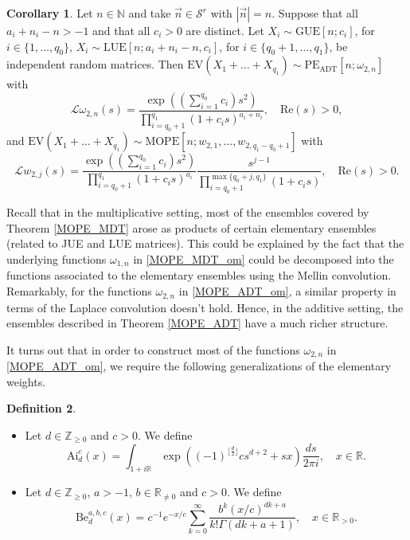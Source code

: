 \documentclass[a4paper,12pt,oneside]{article}
\theoremstyle{definition}
\newtheorem{defi}{Definition}[section]
\newtheorem{cor}[defi]{Corollary}
\newcommand{\N}{\mathbb{N}}
\newcommand{\Z}{\mathbb{Z}}
\newcommand{\R}{\mathbb{R}}
\newcommand{\om}{\omega}
\newcommand{\sz}[1]{\left| \vec{#1} \right|}
\newcommand{\LT}[1]{\mathcal{L}#1}
\begin{document}
\begin{cor} \label{MOPE_ADT_EX}
    Let $n\in\N$ and take $\vec{n}\in\mathcal{S}^r$ with $\sz{n}=n$. Suppose that all $a_i+n_i-n>-1$ and that all $c_i>0$ are distinct. Let 
    $X_i\sim\text{GUE}[n;c_i]$, for $i\in\{1,\dots,q_0\}$,
    $ X_i\sim\text{LUE}[n;a_i+n_i-n,c_i]$, for $i\in\{q_0+1,\dots,q_1\}$, 
    be independent random matrices. Then $\text{EV}(X_1+\dots+X_{q_1})\sim\text{PE}_{\text{ADT}}[n;\om_{2,n}]$
    with
        $$ \LT{\om_{2,n}}(s) = \frac{\exp\left((\sum_{i=1}^{q_0} c_i)s^2\right)}{\prod_{i=q_0+1}^{q_1} (1+c_i s)^{a_i+n_i}},\quad \text{Re}(s)>0, $$
    and $\text{EV}(X_1+\dots+X_{q_1})\sim\text{MOPE}[n;w_{2,1},\dots,w_{2,q_1-q_0+1}]$ with
        $$ \LT{w_{2,j}}(s) = \frac{\exp\left((\sum_{i=1}^{q_0} c_i)s^2\right)}{\prod_{i=q_0+1}^{q_1} (1+c_i s)^{a_i}} \frac{s^{j-1}}{\prod_{i=q_0+1}^{\max\{q_0+j,q_1\}} (1+c_i s)},\quad \text{Re}(s)>0.$$
\end{cor}

Recall that in the multiplicative setting, most of the ensembles covered by Theorem \ref{MOPE_MDT} arose as products of certain elementary ensembles (related to JUE and LUE matrices). This could be explained by the fact that the underlying functions $\om_{1,n}$ in \eqref{MOPE_MDT_om} could be decomposed into the functions associated to the elementary ensembles using the Mellin convolution. Remarkably, for the functions $\om_{2,n}$ in \eqref{MOPE_ADT_om}, a similar property in terms of the Laplace convolution doesn't hold. Hence, in the additive setting, the ensembles described in Theorem \ref{MOPE_ADT} have a much richer structure.
\medbreak

It turns out that in order to construct most of the functions $\om_{2,n}$ in \eqref{MOPE_ADT_om}, we require the following generalizations of the elementary weights. 

\begin{defi} \label{ADT_EX_BF} \phantom{}
    \begin{itemize}
        \item[$i)$] Let $d\in\Z_{\geq 0}$ and $c>0$. We define
        $$\text{Ai}_{d}^{c}(x) = \int_{1+i\R} \exp\left( (-1)^{\lfloor \frac{d}{2} \rfloor} c s^{d+2} + sx \right) \frac{ds}{2\pi i},\quad x\in\R. $$
        \item[$ii)$] Let $d\in\Z_{\geq 0}$, $a>-1$, $b\in\R_{\neq 0}$ and $c>0$. We define
    $$\text{Be}_{d}^{a,b,c}(x) = c^{-1} e^{-x/c} \sum_{k=0}^\infty \frac{b^k (x/c)^{dk+a}}{k! \Gamma(dk+a+1)},\quad x\in\R_{>0}.$$
    \end{itemize}
\end{defi}
\end{document}
